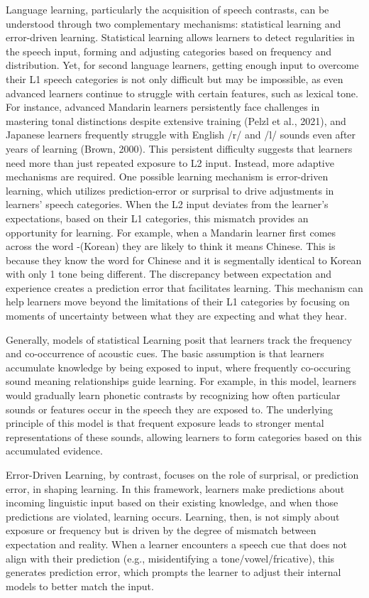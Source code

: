 Language learning, particularly the acquisition of speech contrasts, can be understood through two complementary mechanisms: statistical learning and error-driven learning. Statistical learning allows learners to detect regularities in the speech input, forming and adjusting categories based on frequency and distribution. Yet, for second language learners, getting enough input to overcome their L1 speech categories is not only difficult but may be impossible, as even advanced learners continue to struggle with certain features, such as lexical tone. For instance, advanced Mandarin learners persistently face challenges in mastering tonal distinctions despite extensive training (Pelzl et al., 2021), and Japanese learners frequently struggle with English /r/ and /l/ sounds even after years of learning (Brown, 2000). This persistent difficulty suggests that learners need more than just repeated exposure to L2 input. Instead, more adaptive mechanisms are required. One possible learning mechanism is error-driven learning, which utilizes prediction-error or surprisal to drive adjustments in learners' speech categories. When the L2 input deviates from the learner's expectations, based on their L1 categories, this mismatch provides an opportunity for learning. For example, when a Mandarin learner first comes across the word -(Korean) they are likely to think it means Chinese. This is because they know the word for Chinese  and it is segmentally identical to Korean with only 1 tone being different. The discrepancy between expectation and experience creates a prediction error that facilitates learning. This mechanism can help learners move beyond the limitations of their L1 categories by focusing on moments of uncertainty between what they are expecting and what they hear.

Generally, models of statistical Learning posit that learners track the frequency and co-occurrence of acoustic cues. The basic assumption is that learners accumulate knowledge by being exposed to input, where frequently co-occuring sound meaning relationships guide learning. For example, in this model, learners would gradually learn phonetic contrasts by recognizing how often particular sounds or features occur in the speech they are exposed to. The underlying principle of this model is that frequent exposure leads to stronger mental representations of these sounds, allowing learners to form categories based on this accumulated evidence. 

Error-Driven Learning, by contrast, focuses on the role of surprisal, or prediction error, in shaping learning. In this framework, learners make predictions about incoming linguistic input based on their existing knowledge, and when those predictions are violated, learning occurs. Learning, then, is not simply about exposure or frequency but is driven by the degree of mismatch between expectation and reality. When a learner encounters a speech cue that does not align with their prediction (e.g., misidentifying a tone/vowel/fricative), this generates prediction error, which prompts the learner to adjust their internal models to better match the input. 

